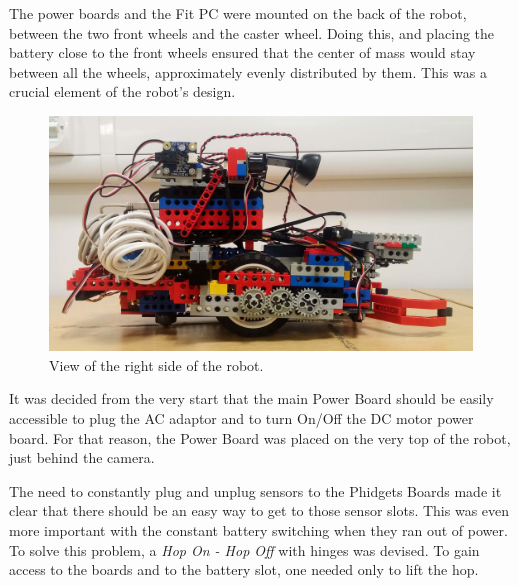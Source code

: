 The power boards and the Fit PC were mounted on the back of the robot, between the two front wheels and the caster wheel. Doing this, and placing the battery close to the front wheels ensured that the center of mass would stay between all the wheels, approximately evenly distributed by them. This was a crucial element of the robot's design.

\begin{figure}[ht]
    \centering
    \includegraphics[width=0.8\linewidth]{res/robot-pics/view-right-side.jpg}
    \caption{View of the right side of the robot.}
\end{figure}

\clearpage

It was decided from the very start that the main Power Board should be easily accessible to plug the AC adaptor and to turn On/Off the DC motor power board. For that reason, the Power Board was placed on the very top of the robot, just behind the camera.

The need to constantly plug and unplug sensors to the Phidgets Boards made it clear that there should be an easy way to get to those sensor slots. This was even more important with the constant battery switching when they ran out of power. To solve this problem, a \textit{Hop On - Hop Off} with hinges was devised. To gain access to the boards and to the battery slot, one needed only to lift the hop.


